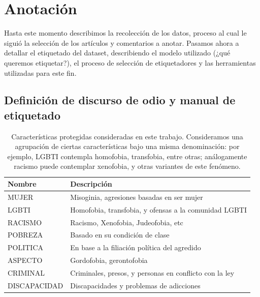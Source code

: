 \section{Anotación}

Hasta este momento describimos la recolección de los datos, proceso al cual le siguió la selección de los artículos y comentarios a anotar. Pasamos ahora a detallar el etiquetado del dataset, describiendo el modelo utilizado (¿qué queremos etiquetar?), el proceso de selección de etiquetadores y las herramientas utilizadas para este fin.


\subsection{Definición de discurso de odio y manual de etiquetado}
\label{sec:05_hate_speech_definition}
\begin{table}[t]
    \centering
    \small
    \begin{tabular}{p{} p{}}
        Nombre & Descripción \\
        \hline
        MUJER        & Misoginia, agresiones basadas en ser mujer  \\
        LGBTI        & Homofobia, transfobia, y ofensas a la comunidad LGBTI \\
        RACISMO      & Racismo, Xenofobia, Judeofobia, etc \\
        POBREZA      & Basado en su condición de clase \\
        POLITICA     & En base a la filiación política del agredido \\
        ASPECTO      & Gordofobia, gerontofobia \\
        CRIMINAL     & Criminales, presos, y personas en conflicto con la ley \\
        DISCAPACIDAD & Discapacidades y problemas de adicciones \\
        \hline
    \end{tabular}
    \caption{Características protegidas consideradas en este trabajo. Consideramos una agrupación de ciertas características bajo una misma denominación: por ejemplo, LGBTI contempla homofobia, transfobia, entre otras; análogamente racismo puede contemplar xenofobia, y otras variantes de este fenómeno. }
    \label{tab:caracteristicas_protegidas}
\end{table}


